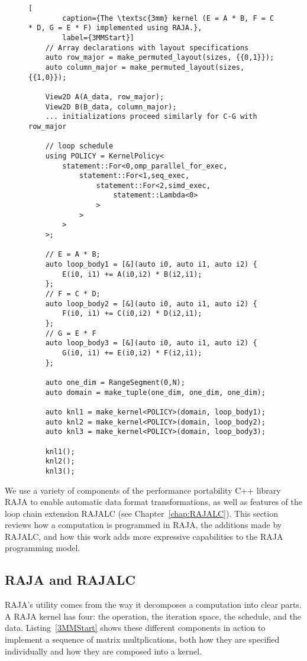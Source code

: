 \begin{figure}
	\begin{lstlisting}[
		caption={The \textsc{3mm} kernel (E = A * B, F = C * D, G = E * F) implemented using RAJA.},
		label={3MMStart}]
	// Array declarations with layout specifications
	auto row_major = make_permuted_layout(sizes, {{0,1}});
	auto column_major = make_permuted_layout(sizes, {{1,0}});

	View2D A(A_data, row_major);
	View2D B(B_data, column_major);
	... initializations proceed similarly for C-G with row_major

	// loop schedule
	using POLICY = KernelPolicy<
		statement::For<0,omp_parallel_for_exec,
			statement::For<1,seq_exec,
				statement::For<2,simd_exec,
					statement::Lambda<0>
				>
			>
		>
	>;

	// E = A * B;
	auto loop_body1 = [&](auto i0, auto i1, auto i2) {
		E(i0, i1) += A(i0,i2) * B(i2,i1);
	};
	// F = C * D;
	auto loop_body2 = [&](auto i0, auto i1, auto i2) {
		F(i0, i1) += C(i0,i2) * D(i2,i1);
	};
	// G = E * F
	auto loop_body3 = [&](auto i0, auto i1, auto i2) {
		G(i0, i1) += E(i0,i2) * F(i2,i1);
	};
	
	auto one_dim = RangeSegment(0,N);
	auto domain = make_tuple(one_dim, one_dim, one_dim);

	auto knl1 = make_kernel<POLICY>(domain, loop_body1);
	auto knl2 = make_kernel<POLICY>(domain, loop_body2);
	auto knl3 = make_kernel<POLICY>(domain, loop_body3);

	knl1();
	knl2();
	knl3();
	\end{lstlisting}

\end{figure}

\label{sec:kernelObjects}

We use a variety of components of the performance portability C++ library RAJA to enable automatic data format transformations, as well as features of the loop chain extension RAJALC (see Chapter~\ref{chap:RAJALC}).
This section reviews how a computation is programmed in RAJA, the additions made by RAJALC, and how this work adds more expressive capabilities to the RAJA programming model.

\subsection{RAJA and RAJALC}

RAJA's utility comes from the way it decomposes a computation into clear parts.
A RAJA kernel has four: the operation, the iteration space, the schedule, and the data. 
Listing~\ref{3MMStart} shows these different components in action to implement a sequence of matrix multplications, both how they are specified individually and how they are composed into a kernel.

